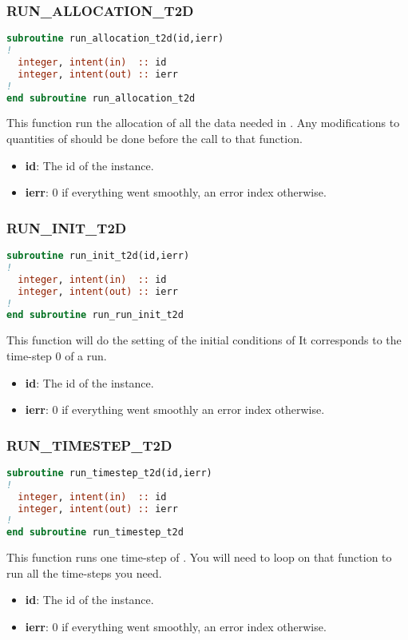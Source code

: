 \subsubsection{RUN\_ALLOCATION\_T2D}
%
\begin{lstlisting}[language=Fortran]
subroutine run_allocation_t2d(id,ierr)
!
  integer, intent(in)  :: id
  integer, intent(out) :: ierr
!
end subroutine run_allocation_t2d
\end{lstlisting}
This function run the allocation of all the data needed in . Any
modifications to quantities of  should be done before the call to that
function.
\begin{itemize}
\item \textbf{id}: The id of the instance.
\item \textbf{ierr}: 0 if everything went smoothly, an error index otherwise.
\end{itemize}
%
\subsubsection{RUN\_INIT\_T2D}
%
\begin{lstlisting}[language=Fortran]
subroutine run_init_t2d(id,ierr)
!
  integer, intent(in)  :: id
  integer, intent(out) :: ierr
!
end subroutine run_run_init_t2d
\end{lstlisting}
This function will do the setting of the initial conditions of  It
corresponds to the time-step 0 of a  run.
\begin{itemize}
\item \textbf{id}: The id of the instance.
\item \textbf{ierr}: 0 if everything went smoothly an error index otherwise.
\end{itemize}
%
\subsubsection{RUN\_TIMESTEP\_T2D}
%
\begin{lstlisting}[language=Fortran]
subroutine run_timestep_t2d(id,ierr)    
!
  integer, intent(in)  :: id
  integer, intent(out) :: ierr
!
end subroutine run_timestep_t2d
\end{lstlisting}
This function runs one time-step of . You will need to loop on that
function to run all the time-steps you need.
\begin{itemize}
\item \textbf{id}: The id of the instance.
\item \textbf{ierr}: 0 if everything went smoothly, an error index otherwise.
\end{itemize}
%
